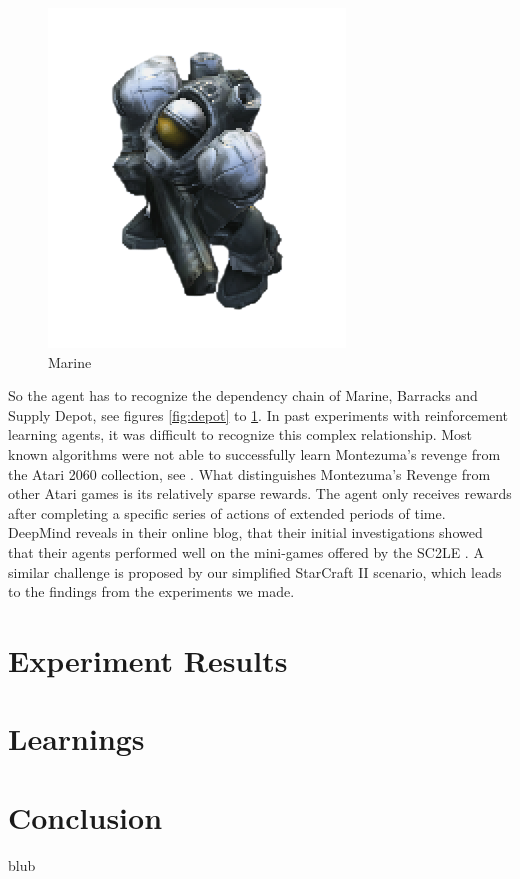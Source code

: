 \documentclass[12pt,a4paper]{article}
\begin{document}
\begin{figure}
    \endminipage\hfill
    \includegraphics[width=\linewidth]{Figures/marine.png}
    \caption{Marine}\label{fig:marine}
    \endminipage
\end{figure}
So the agent has to recognize the dependency chain of Marine, Barracks and Supply Depot, see figures \ref{fig:depot} to \ref{fig:marine}. In past experiments with reinforcement learning agents, it was difficult to recognize this complex relationship. Most known algorithms were not able to successfully learn Montezuma's revenge from the Atari 2060 collection, see \cite{DBLP:journals/corr/abs-1805-11592}. What distinguishes Montezuma's Revenge from other Atari games is its relatively sparse rewards. The agent only receives rewards after completing a specific series of actions of extended periods of time. DeepMind reveals in their online blog, that their initial investigations showed that their agents performed well on the mini-games offered by the SC2LE \cite{DeepMindBlog2017}.
A similar challenge is proposed by our simplified StarCraft II scenario, which leads to the findings from the experiments we made.

\section{Experiment Results}\label{sec:results}
\section{Learnings}
\section{Conclusion}
blub\cite{Mnih2016}
\begin{appendix}
    \listoffigures
    \listoftables
    
\end{appendix}


\end{document}

